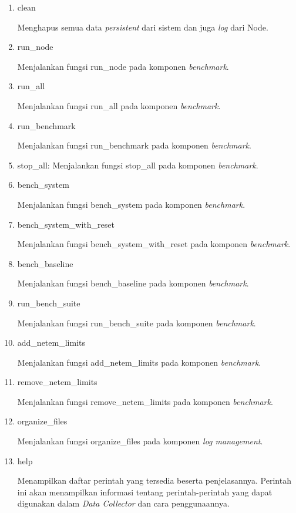 \begin{enumerate}
	\item clean

	      Menghapus semua data \textit{persistent} dari sistem dan juga \textit{log} dari Node.

	\item run\_node

	      Menjalankan fungsi run\_node pada komponen \textit{benchmark}.

	\item run\_all

	      Menjalankan fungsi run\_all pada komponen \textit{benchmark}.

	\item run\_benchmark

	      Menjalankan fungsi run\_benchmark pada komponen \textit{benchmark}.

	\item stop\_all: Menjalankan fungsi stop\_all pada komponen \textit{benchmark}.

	\item bench\_system

	      Menjalankan fungsi bench\_system pada komponen \textit{benchmark}.

	\item bench\_system\_with\_reset

	      Menjalankan fungsi bench\_system\_with\_reset pada komponen \textit{benchmark}.

	\item bench\_baseline

	      Menjalankan fungsi bench\_baseline pada komponen \textit{benchmark}.

	\item run\_bench\_suite

	      Menjalankan fungsi run\_bench\_suite pada komponen \textit{benchmark}.

	\item add\_netem\_limits

	      Menjalankan fungsi add\_netem\_limits pada komponen \textit{benchmark}.

	\item remove\_netem\_limits

	      Menjalankan fungsi remove\_netem\_limits pada komponen \textit{benchmark}.

	\item organize\_files

	      Menjalankan fungsi organize\_files pada komponen \textit{log management}.

	\item help

	      Menampilkan daftar perintah yang tersedia beserta penjelasannya. Perintah ini akan menampilkan informasi tentang perintah-perintah yang dapat digunakan dalam \textit{Data Collector} dan cara penggunaannya.
\end{enumerate}

